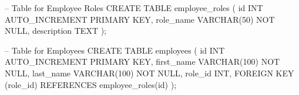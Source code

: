 -- Table for Employee Roles
CREATE TABLE employee_roles (
    id INT AUTO_INCREMENT PRIMARY KEY,
    role_name VARCHAR(50) NOT NULL,
    description TEXT
);

-- Table for Employees
CREATE TABLE employees (
    id INT AUTO_INCREMENT PRIMARY KEY,
    first_name VARCHAR(100) NOT NULL,
    last_name VARCHAR(100) NOT NULL,
    role_id INT,
    FOREIGN KEY (role_id) REFERENCES employee_roles(id)
);